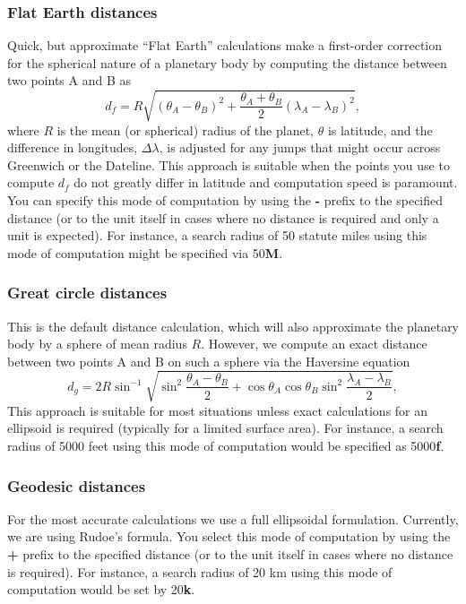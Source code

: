 \subsubsection{Flat Earth distances}
Quick, but approximate ``Flat Earth'' calculations make a first-order correction
for the spherical nature of a planetary body by computing the distance between
two points A and B as
\begin{equation}
	d_f = R \sqrt{(\theta_A - \theta_B)^2 + \frac{\theta_A + \theta_B}{2}(\lambda_A - \lambda_B)^2},
	\label{eq:flatearth}
\end{equation}
where $R$ is the mean (or spherical) radius of the planet, $\theta$ is latitude, and the difference in longitudes, $\Delta \lambda$,
is adjusted for any jumps that might occur across Greenwich or the Dateline.  This approach is suitable
when the points you use to compute $d_f$ do not greatly differ in latitude and computation
speed is paramount. You can specify this mode of computation by using the \textbf{-} prefix to
the specified distance (or to the unit itself in cases where no distance is required and only a unit is expected).
For instance, a search radius of 50 statute miles using this mode of computation might be specified via 50\textbf{M}.

\subsubsection{Great circle distances}
This is the default distance calculation, which will also approximate the planetary body by a sphere of mean
radius $R$. However, we compute an exact distance between two points A and B on such a sphere via
the Haversine equation
\begin{equation}
	d_g = 2R \sin^{-1}  {\sqrt{\sin^2\frac{\theta_A - \theta_B}{2} + \cos \theta_A \cos \theta_B \sin^2 \frac{\lambda_A - \lambda_B}{2}} },
	\label{eq:greatcircle}
\end{equation}
This approach is suitable for most situations unless exact calculations for an ellipsoid
is required (typically for a limited surface area).  For instance, a search radius of 5000 feet using this
mode of computation would be specified as 5000\textbf{f}.

\subsubsection{Geodesic distances}
For the most accurate calculations we use a full ellipsoidal formulation.  Currently,
we are using Rudoe's formula.  You select this mode of computation by using the \textbf{+} prefix to
the specified distance (or to the unit itself in cases where no distance is required).
For instance, a search radius of 20 km using this mode of computation would be set by 20\textbf{k}.

